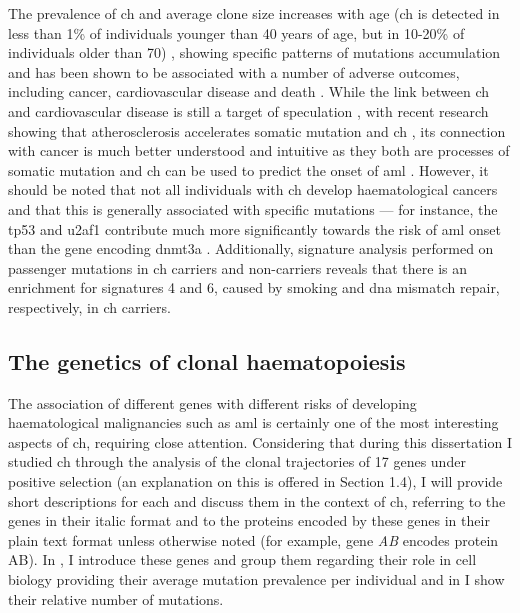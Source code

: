 The prevalence of \ac{ch} and average clone size increases with age (\ac{ch} is detected in less than 1\% of individuals younger than 40 years of age, but in 10-20\% of individuals older than 70) \cite{Jaiswal2014-rl}, showing specific patterns of mutations accumulation \cite{McKerrell2015-rl} and has been shown to be associated with a number of adverse outcomes, including cancer, cardiovascular disease and death \cite{Jaiswal2014-rl,Saleheen2017-eq,Genovese2014-eu,Desai2018-pj,Abelson2018-wh}. While the link between \ac{ch} and cardiovascular disease is still a target of speculation \cite{Evans2021-ae}, with recent research showing that atherosclerosis accelerates somatic mutation and \ac{ch} \cite{Heyde2021-nl}, its connection with cancer is much better understood and intuitive as they both are processes of somatic mutation and \ac{ch} can be used to predict the onset of \ac{aml} \cite{Desai2018-pj,Abelson2018-wh}. However, it should be noted that not all individuals with \ac{ch} develop haematological cancers and that this is generally associated with specific mutations --- for instance, the \ac{tp53} and \ac{u2af1} contribute much more significantly towards the risk of \ac{aml} onset than the gene encoding \ac{dnmt3a} \cite{Abelson2018-wh}. Additionally, signature analysis performed on passenger mutations in \ac{ch} carriers and non-carriers reveals that there is an enrichment for signatures 4 and 6, caused by smoking and \ac{dna} mismatch repair, respectively, in \ac{ch} carriers.

\subsection{The genetics of clonal haematopoiesis}

The association of different genes with different risks of developing haematological malignancies such as \ac{aml} is certainly one of the most interesting aspects of \ac{ch}, requiring close attention. Considering that during this dissertation I studied \ac{ch} through the analysis of the clonal trajectories of 17 genes under positive selection (an explanation on this is offered in Section 1.4), I will provide short descriptions for each and discuss them in the context of \ac{ch}, referring to the genes in their italic format and to the proteins encoded by these genes in their plain text format unless otherwise noted (for example, gene \textit{AB} encodes protein AB). In , I introduce these genes and group them regarding their role in cell biology providing their average mutation prevalence per individual and in  I show their relative number of mutations.

